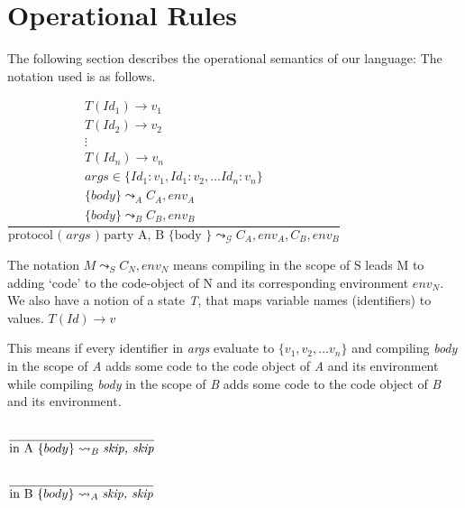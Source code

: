 
\section{Operational Rules}
The following section describes the operational semantics of our language:
The notation used is as follows.



\hspace*{5em} $\dfrac{
  \begin{array}{l}
    T(Id_1) \rightarrow v_1\\
    T(Id_2) \rightarrow v_2\\    
    \vdots\\
    T(Id_n) \rightarrow v_n\\    
     args \in \{Id_1:v_1,Id_1:v_2, \ldots Id_n:v_n\}\\
    \{body\} \leadsto_A C_A, env_A\\
    \{body\} \leadsto_B C_B, env_B
\end{array}
}{\text{protocol ( } args \text{ )  party A, B \{ body \} } \leadsto_\mathscr{G} C_A, env_A, C_B, env_B  }$\bigskip

The notation $M \leadsto_S C_N, env_N$ means compiling in the scope 
of S leads M to adding `code' to the code-object of N and its corresponding 
environment $env_N$. We also have a notion of a state \textit{T}, that maps 
variable names (identifiers) to values.
$T(Id) \rightarrow v$

This means if every identifier in \textit{args} evaluate to $\{v_1, v_2, \ldots v_n\}$
and compiling \textit{body} in the scope of \textit{A} adds some code to the code object
of \textit{A} and its environment while compiling \textit{body} in the scope of \textit{B}
adds some code to the code object of \textit{B} and its environment.\bigskip

\hspace*{10em} $\dfrac{
\begin{array}{l}
    \phantom{}
\end{array}
}{\text{in A } \{body\} \leadsto_B \text{\textit{skip, skip}}}$\bigskip

\hspace*{10em} $\dfrac{
\begin{array}{l}
    \phantom{}
\end{array}
}{\text{in B } \{body\} \leadsto_A \text{\textit{skip, skip}}}$\bigskip


